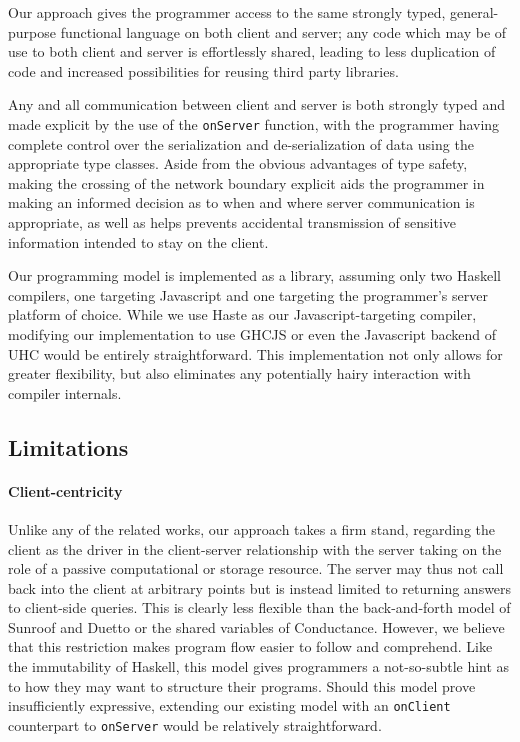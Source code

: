 \documentclass[preprint]{sigplanconf}
\begin{document}
Our approach gives the programmer access to the same strongly typed,
general-purpose functional language on both client and server; any code which
may be of use to both client and server is effortlessly shared, leading to less
duplication of code and increased possibilities for reusing third party
libraries.

Any and all communication between client and server is both strongly typed
and made explicit by the use of the \lstinline!onServer! function, with the
programmer having complete control over the serialization and de-serialization
of data using the appropriate type classes. Aside from the obvious advantages
of type safety, making the crossing of the network boundary explicit aids the
programmer in making an informed decision as to when and where server
communication is appropriate, as well as helps prevents accidental transmission
of sensitive information intended to stay on the client.

Our programming model is implemented as a library, assuming only two Haskell
compilers, one targeting Javascript and one targeting the programmer's server
platform of choice. While we use Haste as our Javascript-targeting compiler,
modifying our implementation to use GHCJS or even the Javascript backend of UHC
would be entirely straightforward. This implementation not only allows for
greater flexibility, but also eliminates any potentially hairy interaction with
compiler internals.

\subsection{Limitations}
\label{sec:limitations}

\paragraph{Client-centricity} Unlike any of the related works, our approach
takes a firm stand, regarding the client as the driver in the client-server
relationship with the server taking on the role of a passive computational
or storage resource. The server may thus not call back into the client at
arbitrary points but is instead limited to returning answers to client-side
queries. This is clearly less flexible than the back-and-forth model of Sunroof
and Duetto or the shared variables of Conductance. However, we believe that
this restriction makes program flow easier to follow and comprehend. Like the
immutability of Haskell, this model gives programmers a not-so-subtle hint
as to how they may want to structure their programs. Should this model prove
insufficiently expressive, extending our existing model with an
\lstinline!onClient! counterpart to \lstinline!onServer! would be relatively
straightforward.
\end{document}

